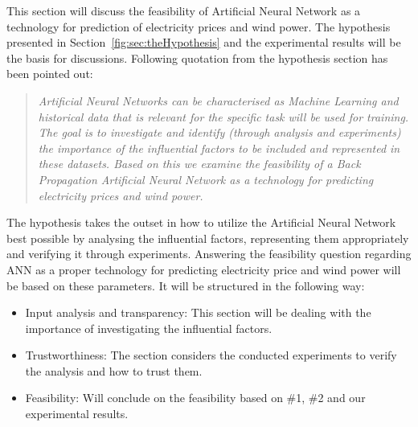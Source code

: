 This section will discuss the feasibility of Artificial Neural Network as a technology for prediction of electricity prices and wind power. The hypothesis presented in Section~\ref{fig:sec:theHypothesis} and the experimental results will be the basis for discussions. Following quotation from the hypothesis section has been pointed out:

\begin{quotation}
\textit{Artificial Neural Networks can be characterised as Machine Learning\cite{18} and historical data that is relevant for the specific task will be used for training. The goal is to investigate and identify (through analysis and experiments) the importance of the influential factors to be included and represented in these datasets. Based on this we examine the feasibility of a Back Propagation Artificial Neural Network as a technology for predicting electricity prices and wind power.}
\end{quotation}

\noindent The hypothesis takes the outset in how to utilize the Artificial Neural Network best possible by analysing the influential factors, representing them appropriately and verifying it through experiments. Answering the feasibility question regarding ANN as a proper technology for predicting electricity price and wind power will be based on these parameters. It will be structured in the following way:

\begin{itemize}
\item Input analysis and transparency: This section will be dealing with the importance of investigating the influential factors.
\item Trustworthiness: The section considers the conducted experiments to verify the analysis and how to trust them.
\item Feasibility: Will conclude on the feasibility based on \#1, \#2 and our experimental results.
\end{itemize}

